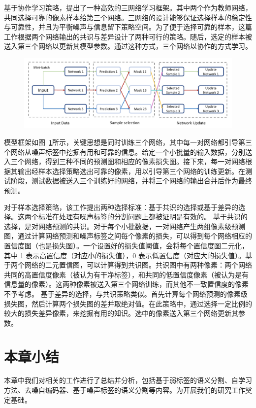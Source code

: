 \citet{Zhang2020RobustMI} 基于协作学习策略，提出了一种高效的三网络学习框架。其中两个作为教师网络，共同选择可靠的像素样本给第三个网络。三网络的设计能够保证选择样本的稳定性与可靠性，并且为平衡噪声与信息留下策略空间。为了便于选择可靠的样本，这篇工作根据两个网络输出的共识与差异设计了两种可行的策略。随后，选定的样本被送入第三个网络以更新其模型参数。通过这种方式，三个网络以协作的方式学习。
    \begin{figure}[tbp]
        \centering 
        \includegraphics[width=1.0\textwidth]{img/c2/rel_c3.png}
        \label{c2_fig13}
    \end{figure}
模型框架如图~\ref{c2_fig13}所示，关键思想是同时训练三个网络，其中每一对网络都引导第三个网络从噪声标签中挖掘有用和可靠的信息。给定一个小批量的输入数据，分别送入三个网络，得到三种不同的预测图和相应的像素损失图。接下来，每一对网络根据其输出经样本选择策略选出可靠的像素，用以引导第三个网络的训练更新。在测试阶段，测试数据被送入三个训练好的网络，并将三个网络的输出合并后作为最终预测。

对于样本选择策略，该工作提出两种选择标准：基于共识的选择或基于差异的选择。这两个标准在处理有噪声标签的分割问题上都被证明是有效的。
基于共识的选择，是对网络预测的共识。对于每个小批数据，一对网络产生两组像素级预测图，通过计算网络预测和噪声标签之间每个像素的损失，可以得到每个网络相应的置信度图（也是损失图）。一个设置好的损失值阈值，会将每个置信度图二元化，其中 1 表示高置信度（对应小的损失值），0 表示低置信度（对应大的损失值）。基于两个网络的二元置信图，可以计算得到共识图。共识图中有两种像素：两个网络共同的高置信度像素（被认为有干净标签），和共同的低置信度像素（被认为是有信息量的像素）。这两种像素被送入第三个网络训练，而其他不一致置信度的像素不予考虑。
基于差异的选择，与共识策略类似。首先计算每个网络预测的像素级损失图，然后计算两个损失图的差并取绝对值。在此策略中，通过选择一定比例的较大的损失差异像素，来挖掘有用的知识。选中的像素送入第三个网络更新其参数。


\section{本章小结}
本章中我们对相关的工作进行了总结并分析，包括基于弱标签的语义分割、自学习方法、去噪自编码器、基于噪声标签的语义分割等内容。为开展我们的研究工作奠定基础。

